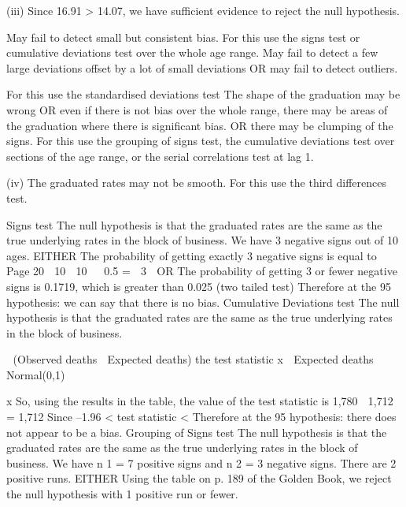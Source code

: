 \documentclass[a4paper,12pt]{article}
\begin{document}
{(iii)
Since 16.91 > 14.07, 
we have sufficient evidence to reject the null hypothesis. 

May fail to detect small but consistent bias. 
For this use the signs test or cumulative deviations test over the
whole age range. 
May fail to detect a few large deviations offset by a lot of small deviations
OR
may fail to detect outliers.

For this use the standardised deviations test 
The shape of the graduation may be wrong
OR
even if there is not bias over the whole range, there may be areas of the
graduation where there is significant bias.
OR
there may be clumping of the signs. 
For this use the grouping of signs test, the cumulative deviations test over
sections of the age range, or the serial correlations test at lag 1.

(iv)
The graduated rates may not be smooth. 
For this use the third differences test. 

Signs test
The null hypothesis is that the graduated rates are the same as the true
underlying rates in the block of business. 
We have 3 negative signs out of 10 ages. 
EITHER
The probability of getting exactly 3 negative signs is equal to
Page 20%
 10  10
  0.5 \;=
 3 
OR
The probability of getting 3 or fewer negative signs is 0.1719, %
which is greater than 0.025 (two tailed test) 
Therefore at the 95%
hypothesis: we can say that there is no bias. 
Cumulative Deviations test
The null hypothesis is that the graduated rates are the same as the true
underlying rates in the block of business.

 (Observed deaths  Expected deaths)
the test statistic
x
 Expected deaths
~ Normal(0,1)

x
So, using the results in the table, the value of the test statistic is
1,780  1,712
\;=
1,712 %
Since –1.96 < test statistic < %
Therefore at the 95%
hypothesis: there does not appear to be a bias. 
Grouping of Signs test
The null hypothesis is that the graduated rates are the same as the true
underlying rates in the block of business. 
We have n 1 = 7 positive signs and n 2 = 3 negative signs. 
There are 2 positive runs. 
EITHER
Using the table on p. 189 of the Golden Book, we reject the null
hypothesis with 1 positive run or fewer.

}
\end{document}

